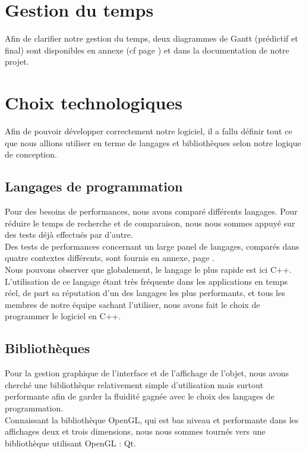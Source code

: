 \documentclass[a4paper]{memoir}
\begin{document}
		\section{Gestion du temps}
			\label{GestionTps}
			Afin de clarifier notre gestion du temps, deux diagrammes de Gantt (prédictif et final) sont disponibles en annexe (cf page \pageref{fig:gantt}) 
			et dans la documentation de notre projet.\\

		\section{Choix technologiques}
			Afin de pouvoir développer correctement notre logiciel, il a fallu définir tout ce que nous allions utiliser en terme de langages et 
			bibliothèques selon notre logique de conception.
			
			\subsection{Langages de programmation}
				Pour des besoins de performances, nous avons comparé différents langages. Pour réduire le temps de recherche et de comparaison, nous nous 
				sommes appuyé sur des tests déjà effectués par d'autre.\\ Des tests de performances concernant un large panel de langages, comparés dans 
				quatre contextes différents, sont fournis en annexe, page \pageref{fig:analyse}.\\ Nous pouvons observer que globalement, le langage le plus 
				rapide est ici C++. L'utilisation de ce langage étant très fréquente dans les applications en temps réel, de part sa réputation d'un des 
				langages les plus performants, et tous les membres de notre équipe sachant l'utiliser, nous avons fait le choix de programmer le logiciel en 
				C++.\\

			\subsection{Bibliothèques}
				Pour la gestion graphique de l'interface et de l'affichage de l'objet, nous avons cherché une bibliothèque relativement simple d'utilisation 
				mais surtout performante afin de garder la fluidité gagnée avec le choix des langages de programmation.\\ Connaissant la bibliothèque 
				OpenGL, qui est bas niveau et performante dans les affichages deux et trois dimensions, nous nous sommes tournés vers une bibliothèque 
				utilisant OpenGL : Qt.\\
\end{document}

